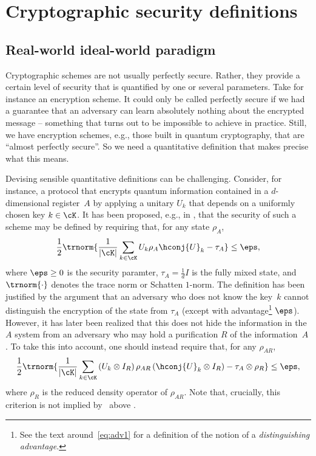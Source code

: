 \section{Cryptographic security definitions}
\label{sec:ac}

\subsection{Real-world ideal-world paradigm}
\label{sec:ac.realideal}

Cryptographic schemes are not usually perfectly secure. Rather, they provide a certain level of security that is quantified by one or several parameters. Take for instance an encryption scheme. It could only be called perfectly secure if we had a guarantee that an adversary can learn absolutely nothing about the encrypted message \--- something that turns out to be impossible to achieve in practice. Still, we have encryption schemes, e.g., those built in quantum cryptography, that are ``almost perfectly secure''. So we need a quantitative definition that makes precise what this means.

Devising sensible quantitative definitions can be challenging.  Consider, for instance, a protocol that encrypts quantum information contained in a $d$-dimensional register~$A$ by applying a unitary $U_k$ that depends on a uniformly chosen key $k \in \cK$. It has been proposed, e.g., in \textcite{AS04,HLSW04,DN06}, that the security of such a scheme may be defined by requiring that, for any state $\rho_A$,
\begin{equation} \label{eq:encryption.naive}
  \frac{1}{2}\trnorm{\frac{1}{|\cK|} \sum_{k \in \cK} U_k \rho_A \hconj{U}_k -
    \tau_A} \leq \eps,
\end{equation}
where $\eps \geq 0$ is the security paramter, $\tau_A = \frac{1}{d} I$ is the fully mixed state, and $\trnorm{\cdot}$ denotes the trace norm or
Schatten $1$-norm. The definition has been justified by the argument that an adversary who does not know the key~$k$ cannot distinguish the encryption of the state from $\tau_A$
(except with advantage\footnote{See the text around~\eqref{eq:adv1} for a definition of the notion of a \emph{distinguishing advantage}.} $\eps$). However, it has later been realized that this does not hide
the information in the $A$ system from an adversary who may hold a purification
$R$ of the information~$A$ \cite{ABW09}. To take this into account, one should instead require that,
for any $\rho_{AR}$,
\begin{equation*} %
  \frac{1}{2}\trnorm{\frac{1}{|\cK|} \sum_{k \in \cK} \left(U_k \otimes I_R
    \right) \rho_{AR} \left(\hconj{U}_k \otimes I_R\right) - \tau_A
    \otimes \rho_R} \leq \eps,
\end{equation*}
where $\rho_R$ is the reduced density operator of $\rho_{AR}$. Note
that, crucially, this criterion is not implied
by~ above \cite{Wat18}.

